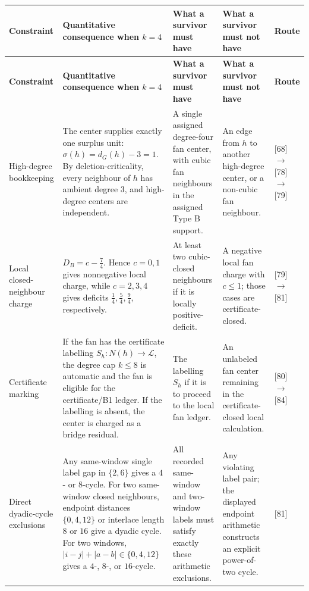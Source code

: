 \documentclass[11pt]{article}
\newcommand{\labels}{\mathcal L}
\begin{document}
{\scriptsize\setlength{\tabcolsep}{2.5pt}
\begin{longtable}{L{0.16\textwidth} L{0.19\textwidth} L{0.23\textwidth} L{0.23\textwidth} L{0.10\textwidth}}
\toprule
\textbf{Constraint} & \textbf{Quantitative consequence when \(k=4\)} &
\textbf{What a survivor must have} &
\textbf{What a survivor must not have} &
\textbf{Route}\\
\midrule
\endfirsthead
\toprule
\textbf{Constraint} & \textbf{Quantitative consequence when \(k=4\)} &
\textbf{What a survivor must have} &
\textbf{What a survivor must not have} &
\textbf{Route}\\
\midrule
\endhead
High-degree bookkeeping
&
The center supplies exactly one surplus unit:
\(\sigma(h)=d_G(h)-3=1\).  By deletion-criticality, every neighbour of \(h\)
has ambient degree \(3\), and high-degree centers are independent.
&
A single assigned degree-four fan center, with cubic fan neighbours in the
assigned Type B support.
&
An edge from \(h\) to another high-degree center, or a non-cubic fan neighbour.
&
[68]\(\to\)[78]\(\to\)[79]\\
\addlinespace
Local closed-neighbour charge
&
\(D_B=c-\frac74\).  Hence \(c=0,1\) gives nonnegative local charge, while
\(c=2,3,4\) gives deficits \(\frac14,\frac54,\frac94\), respectively.
&
At least two cubic-closed neighbours if it is locally positive-deficit.
&
A negative local fan charge with \(c\le1\); those cases are
certificate-closed.
&
[79]\(\to\)[81]\\
\addlinespace
Certificate marking
&
If the fan has the certificate labelling \(S_h:N(h)\to\labels\), the degree cap
\(k\le8\) is automatic and the fan is eligible for the certificate/B1 ledger.
If the labelling is absent, the center is charged as a bridge residual.
&
The labelling \(S_h\) if it is to proceed to the local fan ledger.
&
An unlabeled fan center remaining in the certificate-closed local calculation.
&
[80]\(\to\)[84]\\
\addlinespace
Direct dyadic-cycle exclusions
&
Any same-window single label gap in \(\{2,6\}\) gives a \(4\)- or \(8\)-cycle.
For two same-window closed neighbours, endpoint distances
\(\{0,4,12\}\) or interlace length \(8\) or \(16\) give a dyadic cycle.  For
two windows, \(|i-j|+|a-b|\in\{0,4,12\}\) gives a \(4\)-, \(8\)-, or
\(16\)-cycle.
&
All recorded same-window and two-window labels must satisfy exactly these
arithmetic exclusions.
&
Any violating label pair; the displayed endpoint arithmetic constructs an
explicit power-of-two cycle.
&
[81]\\

\end{longtable}}
\end{document}

